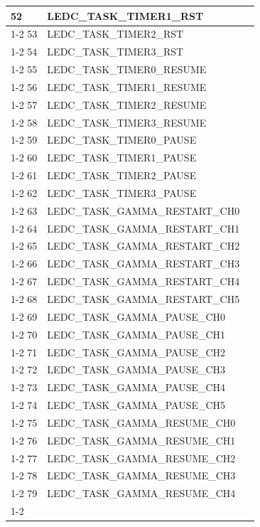 \documentclass[main\_\_CN.tex]{subfiles}
\begin{document}
\begin{longtable}{ | l | l | l | }
52  & LEDC\_TASK\_TIMER1\_RST  & \\ \cline{1-2}
53  & LEDC\_TASK\_TIMER2\_RST  & \\ \cline{1-2}
54  & LEDC\_TASK\_TIMER3\_RST  & \\ \cline{1-2}
55  & LEDC\_TASK\_TIMER0\_RESUME    & \\ \cline{1-2}
56  & LEDC\_TASK\_TIMER1\_RESUME    & \\ \cline{1-2}
57  & LEDC\_TASK\_TIMER2\_RESUME    & \\ \cline{1-2}
58  & LEDC\_TASK\_TIMER3\_RESUME    & \\ \cline{1-2}
59  & LEDC\_TASK\_TIMER0\_PAUSE& \\ \cline{1-2}
60  & LEDC\_TASK\_TIMER1\_PAUSE& \\ \cline{1-2}
61  & LEDC\_TASK\_TIMER2\_PAUSE& \\ \cline{1-2}
62  & LEDC\_TASK\_TIMER3\_PAUSE& \\ \cline{1-2}
63  & LEDC\_TASK\_GAMMA\_RESTART\_CH0      & \\ \cline{1-2}
64  & LEDC\_TASK\_GAMMA\_RESTART\_CH1      & \\ \cline{1-2}
65  & LEDC\_TASK\_GAMMA\_RESTART\_CH2      & \\ \cline{1-2}
66  & LEDC\_TASK\_GAMMA\_RESTART\_CH3      & \\ \cline{1-2}
67  & LEDC\_TASK\_GAMMA\_RESTART\_CH4      & \\ \cline{1-2}
68  & LEDC\_TASK\_GAMMA\_RESTART\_CH5      & \\ \cline{1-2}
69  & LEDC\_TASK\_GAMMA\_PAUSE\_CH0 & \\ \cline{1-2}
70  & LEDC\_TASK\_GAMMA\_PAUSE\_CH1 & \\ \cline{1-2}
71  & LEDC\_TASK\_GAMMA\_PAUSE\_CH2 & \\ \cline{1-2}
72  & LEDC\_TASK\_GAMMA\_PAUSE\_CH3 & \\ \cline{1-2}
73  & LEDC\_TASK\_GAMMA\_PAUSE\_CH4 & \\ \cline{1-2}
74  & LEDC\_TASK\_GAMMA\_PAUSE\_CH5 & \\ \cline{1-2}
75  & LEDC\_TASK\_GAMMA\_RESUME\_CH0& \\ \cline{1-2}
76  & LEDC\_TASK\_GAMMA\_RESUME\_CH1& \\ \cline{1-2}
77  & LEDC\_TASK\_GAMMA\_RESUME\_CH2& \\ \cline{1-2}
78  & LEDC\_TASK\_GAMMA\_RESUME\_CH3& \\ \cline{1-2}
79  & LEDC\_TASK\_GAMMA\_RESUME\_CH4& \\ \cline{1-2}

\end{longtable}
\end{document}
